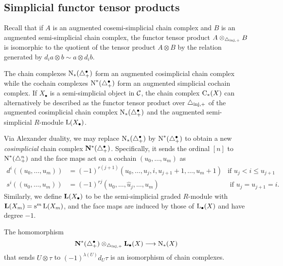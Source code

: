 
\subsection{Simplicial functor tensor products}
Recall that if $A$ is an augmented cosemi-simplicial chain complex and $B$ is an augmented semi-simplicial chain complex, the functor tensor product $A\otimes_{\asimplexinj} B$ is isomorphic to the quotient of the tensor product $A\otimes B$ by the relation generated by $d_i a\otimes b \sim a\otimes d_i b$.

The chain complexes $\chains_*(\asimplex^\bullet)$ form an augmented cosimplicial chain complex while the cochain complexes $\chains^*(\asimplex^\bullet)$ form an augmented simplicial cochain complex. If $X_\bullet$ is a semi-simplicial object in $\cC$, the chain complex $\uchains_*(X)$ can alternatively be described as the functor tensor product over $\asimplexinj$ of the augmented cosimplicial chain complex $\chains_*(\asimplex^{\bullet})$ and the augmented semi-simplicial $R$-module $\rA(X_\bullet)$.

Via Alexander duality, we may replace $\chains_*(\asimplex^\bullet )$ by $\chains^*(\asimplex^\bullet)$ to obtain a new \emph{cosimplicial} chain complex $\NN^*(\asimplex^\bullet)$. Specifically, it sends the ordinal $[n]$ to $\chains^*(\asimplex^n)$ and the face maps act on a cochain $(u_0,\ldots,u_m)$ as
\begin{align*}
	d^i((u_0,\ldots,u_m)) &=
	(-1)^{r(j+1)}(u_0,\ldots,u_{j},i,u_{j+1}+1,\ldots,u_{m}+1)
	& \text{if $u_j<i \leq u_{j+1}$}
	\\
	s^i((u_0,\ldots,u_m)) &= (-1)^{rj}(u_0,\ldots,\hat{u}_j,\ldots,u_m)
	& \text{ if $u_j = u_{j+1} = i$.}
\end{align*}
Similarly, we define $\AA(X_\bullet)$ to be the semi-simplicial graded $R$-module with $\AA(X_m) = \sus{m}\rA(X_m)$, and the face maps are induced by those of $\rA_\bullet(X)$ and have degree $-1$.

\begin{lemma}\label{lemma:1} The homomorphism
	\[
	\NN^*(\asimplex^\bullet)\otimes_{\asimplexinj} \AA_\bullet(X)\lra \chains_*(X)
	\]
	that sends $U\otimes \tau$ to $(-1)^{\lambda(U)}d_U\tau$ is an isomorphism of chain complexes.
\end{lemma}

